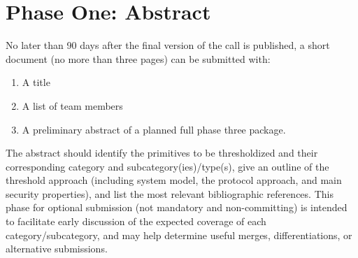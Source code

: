 \section{Phase One: Abstract}

No later than 90 days after the final version of the call is published, a short
document (no more than three pages) can be submitted with:

\begin{enumerate}
  \item A title
  \item A list of team members
  \item A preliminary abstract of a planned full phase three package.
\end{enumerate}

The abstract should identify the primitives to be thresholdized and their corresponding
category and subcategory(ies)/type(s), give an outline of the threshold approach
(including system model, the protocol approach, and main security properties), and
list the most relevant bibliographic references. This phase for optional submission
(not mandatory and non-committing) is intended to facilitate early discussion of the
expected coverage of each category/subcategory, and may help determine useful
merges, differentiations, or alternative submissions.
